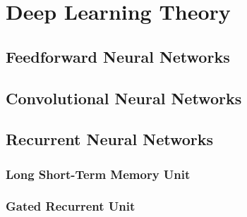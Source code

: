 \documentclass[./main.tex]{subfiles}
\begin{document}
\section{Deep Learning Theory}

\subsection{Feedforward Neural Networks}
\subsection{Convolutional Neural Networks}
\subsection{Recurrent Neural Networks}
\subsubsection{Long Short-Term Memory Unit}
\subsubsection{Gated Recurrent Unit}
\end{document}
